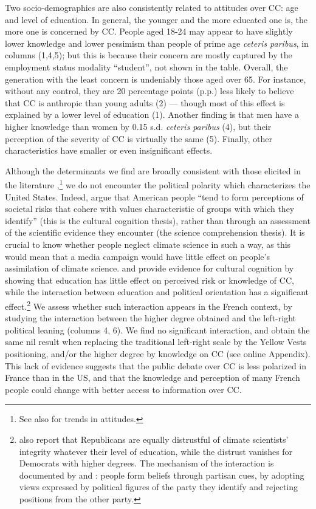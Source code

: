 \documentclass[english,5p,authoryear]{elsarticle}
\begin{document}
Two socio-demographics are also consistently related to attitudes over CC: age and level of education. In general, the younger and the more educated one is, the more one is concerned by CC. People aged 18-24 may appear to have slightly lower knowledge and lower pessimism than people of prime age \textit{ceteris paribus}, in columns (1,4,5); but this is because their concern are mostly captured by the employment status modality ``student'', not shown in the table. Overall, the generation with the least concern is undeniably those aged over 65. For instance, without any control, they are 20 percentage points (p.p.) less likely to believe that CC is anthropic than young adults (2) --- though most of this effect is explained by a lower level of education (1). Another finding is that men have a higher knowledge than women by 0.15 s.d. \textit{ceteris paribus} (4), but their perception of the severity of CC is virtually the same (5). Finally, other characteristics have smaller or even insignificant effects. 

Although the determinants we find are broadly consistent with those elicited in the literature \citep{upham_public_2009,whitmarsh_scepticism_2011, ademe_representations_2018},\footnote{See also \citet{capstick_international_2015} for trends in attitudes.} we do not encounter the political polarity which characterizes the United States. Indeed, \citet{kahan_polarizing_2012} argue that American people ``tend to form perceptions of societal risks that cohere with values characteristic of groups with which they identify'' (this is the cultural cognition thesis), rather than through an assessment of the scientific evidence they encounter (the science comprehension thesis). It is crucial to know whether people neglect climate science in such a way, as this would mean that a media campaign would have little effect on people's assimilation of climate science. \citet{kahan_polarizing_2012} and \citet{mccright_politicization_2011} provide evidence for cultural cognition by showing that education has little effect on perceived risk or knowledge of CC, while the interaction between education and political orientation has a significant effect.\footnote{\citet{funk_politics_2016} also report that Republicans are equally distrustful of climate scientists' integrity whatever their level of education, while the distrust vanishes for Democrats with higher degrees. The mechanism of the interaction is documented by \citet{ehret_partisan_2018} and \citet{van_boven_psychological_2018}: people form beliefs through partisan cues, by adopting views expressed by political figures of the party they identify and rejecting positions from the other party.} We assess whether such interaction appears in the French context, by studying the interaction between the higher degree obtained and the left-right political leaning (columns 4, 6). We find no significant interaction, and obtain the same nil result when replacing the traditional left-right scale by the Yellow Vests positioning, and/or the higher degree by knowledge on CC (see online Appendix). This lack of evidence suggests that the public debate over CC is less polarized in France than in the US, and that the knowledge and perception of many French people could change with better access to information over CC. 
\end{document}
